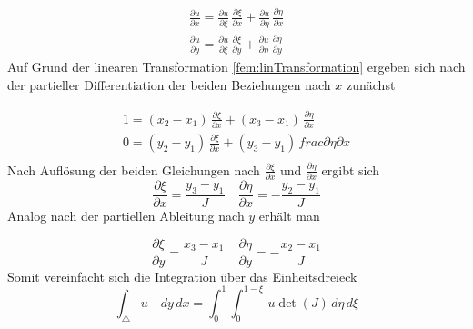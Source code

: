 \begin{equation}
\begin{split}
	\frac{\partial u}{\partial x} = \frac{\partial u}{\partial \xi} \, \frac{\partial \xi}{\partial x} + \frac{\partial u}{\partial \eta} \, \frac{\partial \eta}{\partial x} \\
	\frac{\partial u}{\partial y} = \frac{\partial u}{\partial \xi} \, \frac{\partial \xi}{\partial y} + \frac{\partial u}{\partial \eta} \, \frac{\partial \eta}{\partial y}
	\end{split}
\end{equation}
Auf Grund der linearen Transformation \eqref{fem:linTransformation} ergeben sich nach der partieller Differentiation der beiden Beziehungen nach $x$ zunächst

\begin{equation}
			\begin{aligned}
			1  = (x_2 -x_1) \, \frac{\partial \xi}{\partial x} + (x_3 -x_1) \, \frac{\partial \eta}{\partial x} \\
			0 = (y_2 -y_1) \, \frac{\partial \xi}{\partial x} + (y_3 -y_1) \, frac{\partial \eta}{\partial x} \\
			 \end{aligned}
\end{equation}
Nach Auflösung  der beiden Gleichungen nach $\frac{\partial \xi}{\partial x}$ und $\frac{\partial \eta}{\partial x}$ ergibt sich
\begin{equation}
			\frac{\partial \xi}{\partial x} = \frac{y_3 - y_1}{J} \quad \frac{\partial \eta}{\partial x} = -\frac{y_2 - y_1}{J}
\end{equation}
Analog nach der partiellen Ableitung nach $y$ erhält man

\begin{equation}
			\frac{\partial \xi}{\partial y} = \frac{x_3 - x_1}{J} \quad \frac{\partial \eta}{\partial y} = -\frac{x_2 - x_1}{J}
\end{equation}
Somit vereinfacht sich die Integration über das Einheitsdreieck 
\begin{equation}
			\int_{\triangle} u \quad dy \, dx = \int_0^1 \int_0^{1 - \xi} \, u \det (J) \, d \eta \, d \xi
\end{equation}

